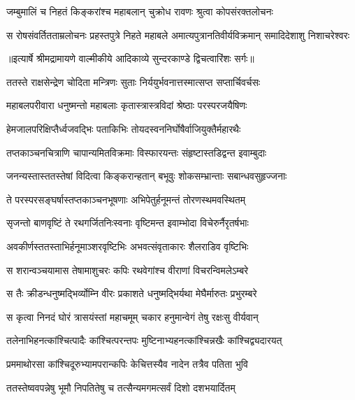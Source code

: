 \twolineshloka
{जम्बुमालिं च निहतं किङ्करांश्च महाबलान्}
{चुक्रोध रावणः श्रुत्वा कोपसंरक्तलोचनः} %

\fourlineindentedshloka
{स रोषसंवर्तितताम्रलोचनः}
{प्रहस्तपुत्रे निहते महाबले}
{अमात्यपुत्रानतिवीर्यविक्रमान्}
{समादिदेशाशु निशाचरेश्वरः} %


{॥इत्यार्षे श्रीमद्रामायणे वाल्मीकीये आदिकाव्ये सुन्दरकाण्डे द्विचत्वारिंशः सर्गः॥}


\twolineshloka
{ततस्ते राक्षसेन्द्रेण चोदिता मन्त्रिणः सुताः}
{निर्ययुर्भवनात्तस्मात्सप्त सप्तार्चिवर्चसः} %

\twolineshloka
{महाबलपरीवारा धनुष्मन्तो महाबलाः}
{कृतास्त्रास्त्रविदां श्रेष्ठाः परस्परजयैषिणः} %

\twolineshloka
{हेमजालपरिक्षिप्तैर्ध्वजवद्भिः पताकिभिः}
{तोयदस्वननिर्घोषैर्वाजियुक्तैर्महारथैः} %

\twolineshloka
{तप्तकाञ्चनचित्राणि चापान्यमितविक्रमाः}
{विस्फारयन्तः संहृष्टास्तडिद्वन्त इवाम्बुदाः} %

\twolineshloka
{जनन्यस्तास्ततस्तेषां विदित्वा किङ्करान्हतान्}
{बभूवुः शोकसम्भ्रान्ताः सबान्धवसुहृज्जनाः} %

\twolineshloka
{ते परस्परसङ्घर्षास्तप्तकाञ्चनभूषणाः}
{अभिपेतुर्हनूमन्तं तोरणस्थमवस्थितम्} %

\twolineshloka
{सृजन्तो बाणवृष्टिं ते रथगर्जितनिःस्वनाः}
{वृष्टिमन्त इवाम्भोदा विचेरुर्नैरृतर्षभाः} %

\twolineshloka
{अवकीर्णस्ततस्ताभिर्हनूमाञ्शरवृष्टिभिः}
{अभवत्संवृताकारः शैलराडिव वृष्टिभिः} %

\twolineshloka
{स शरान्वञ्चयामास तेषामाशुचरः कपिः}
{रथवेगांश्च वीराणां विचरन्विमलेऽम्बरे} %

\twolineshloka
{स तैः क्रीडन्धनुष्मद्भिर्व्योम्नि वीरः प्रकाशते}
{धनुष्मद्भिर्यथा मेघैर्मारुतः प्रभुरम्बरे} %

\twolineshloka
{स कृत्वा निनदं घोरं त्रासयंस्तां महाचमूम्}
{चकार हनुमान्वेगं तेषु रक्षःसु वीर्यवान्} %

\twolineshloka
{तलेनाभिहनत्कांश्चित्पादैः कांश्चित्परन्तपः}
{मुष्टिनाभ्यहनत्कांश्चिन्नखैः कांश्चिद्व्यदारयत्} %

\twolineshloka
{प्रममाथोरसा कांश्चिदूरुभ्यामपरान्कपिः}
{केचित्तस्यैव नादेन तत्रैव पतिता भुवि} %

\twolineshloka
{ततस्तेष्ववपन्नेषु भूमौ निपतितेषु च}
{तत्सैन्यमगमत्सर्वं दिशो दशभयार्दितम्} %


